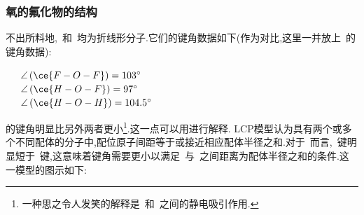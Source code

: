 \documentclass{ctexbook}
\begin{document}
\subsubsection{氧的氟化物的结构}
不出所料地,~和~均为折线形分子.它们的键角数据如下(作为对比,这里一并放上~的键角数据):
\begin{tightcenter}
    \ \ \ $\angle\left(\ce{F-O-F}\right)=103^\circ$\\
    \ \ \ $\angle\left(\ce{H-O-F}\right)=97^\circ$\\
    \ \ \ $\angle\left(\ce{H-O-H}\right)=104.5^\circ$
\end{tightcenter}
\indent {}的键角明显比另外两者更小\footnote{一种思之令人发笑的解释是~和~之间的静电吸引作用.}.这一点可以用\cite{Gillespie2000}进行解释. LCP模型认为具有两个或多个不同配体的分子中,配位原子间距等于或接近相应配体半径之和.对于~而言,~键明显短于~键,这意味着键角需要更小以满足~与~之间距离为配体半径之和的条件.这一模型的图示如下:
\end{document}
